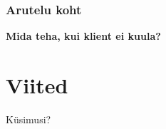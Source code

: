 \begin{frame}[fragile]
  \frametitle{Arutelu koht}
		\begin{center}
			\textbf{Mida teha, kui klient ei kuula?}
		\end{center}
\end{frame}


\section{Viited}

\begin{frame}[t,allowframebreaks,]
  	
	 

\end{frame}

\begin{frame}[plain]
	\begin{center}Küsimusi?\end{center}
\end{frame}

